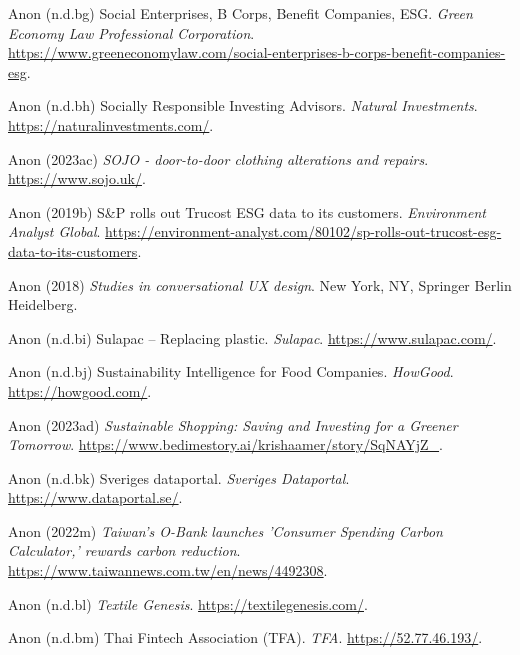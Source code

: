 \documentclass[
  letterpaper,
  DIV=11,
  numbers=noendperiod]{scrartcl}
\newlength{\cslhangindent}
\newenvironment{CSLReferences}[2] %
 {\begin{list}{}{%
  \setlength{\itemindent}{0pt}
  \setlength{\leftmargin}{0pt}
  \setlength{\parsep}{0pt}
  \ifodd #1
   \setlength{\leftmargin}{\cslhangindent}
   \setlength{\itemindent}{-1\cslhangindent}
  \fi
  \setlength{\itemsep}{#2\baselineskip}}}
 {\end{list}}
\begin{document}
\begin{CSLReferences}{0}{1}
Anon (n.d.bg) Social {Enterprises}, {B Corps}, {Benefit Companies},
{ESG}. \emph{Green Economy Law Professional Corporation}.
\url{https://www.greeneconomylaw.com/social-enterprises-b-corps-benefit-companies-esg}.

Anon (n.d.bh) Socially {Responsible Investing Advisors}. \emph{Natural
Investments}. \url{https://naturalinvestments.com/}.

Anon (2023ac) \emph{{SOJO} - door-to-door clothing alterations and
repairs}. \url{https://www.sojo.uk/}.

Anon (2019b) S\&{P} rolls out {Trucost ESG} data to its customers.
\emph{Environment Analyst Global}.
\url{https://environment-analyst.com/80102/sp-rolls-out-trucost-esg-data-to-its-customers}.

Anon (2018) \emph{Studies in conversational {UX} design}. New York, NY,
Springer Berlin Heidelberg.

Anon (n.d.bi) Sulapac -- {Replacing} plastic. \emph{Sulapac}.
\url{https://www.sulapac.com/}.

Anon (n.d.bj) Sustainability {Intelligence} for {Food Companies}.
\emph{HowGood}. \url{https://howgood.com/}.

Anon (2023ad) \emph{Sustainable {Shopping}: {Saving} and {Investing} for
a {Greener Tomorrow}}.
\url{https://www.bedimestory.ai/krishaamer/story/SqNAYjZ_}.

Anon (n.d.bk) Sveriges dataportal. \emph{Sveriges Dataportal}.
\url{https://www.dataportal.se/}.

Anon (2022m) \emph{Taiwan's {O-Bank} launches '{Consumer Spending Carbon
Calculator},' rewards carbon reduction}.
\url{https://www.taiwannews.com.tw/en/news/4492308}.

Anon (n.d.bl) \emph{Textile {Genesis}}.
\url{https://textilegenesis.com/}.

Anon (n.d.bm) Thai {Fintech Association} ({TFA}). \emph{TFA}.
\url{https://52.77.46.193/}.


\end{CSLReferences}
\end{document}
